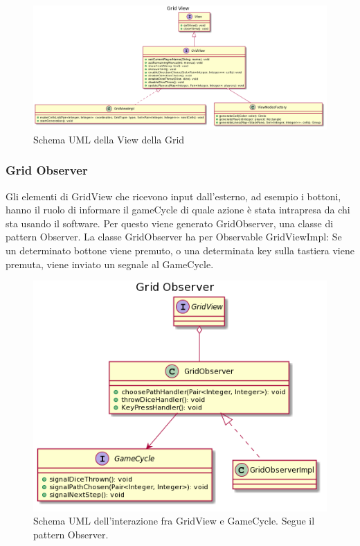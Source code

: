 \documentclass[a4paper,12pt]{report}
\begin{document}
	\begin{figure}[h]
		\centering{}
		\includegraphics[width=\textwidth]{images/ascenzo/grid_view.png}
		\caption{Schema UML della View della Grid}
		\label{img:gridview}
	\end{figure}

    \subsubsection {Grid Observer}
	Gli elementi di GridView che ricevono input dall’esterno, ad esempio i bottoni, hanno il ruolo di informare il gameCycle di quale azione è stata intrapresa da chi sta usando il software.
	Per questo viene generato GridObserver, una classe di pattern Observer.
	La classe GridObserver ha per Observable GridViewImpl: Se un determinato bottone viene premuto, o una determinata key sulla tastiera viene premuta, viene inviato un segnale al GameCycle.

	\begin{figure}[h]
	\centering{}
	\includegraphics[width=\textwidth]{images/ascenzo/grid_observer.png}
	\caption{Schema UML dell'interazione fra GridView e GameCycle. Segue il pattern Observer.}
	\label{img:gridobserver}
	\end{figure}
\end{document}
